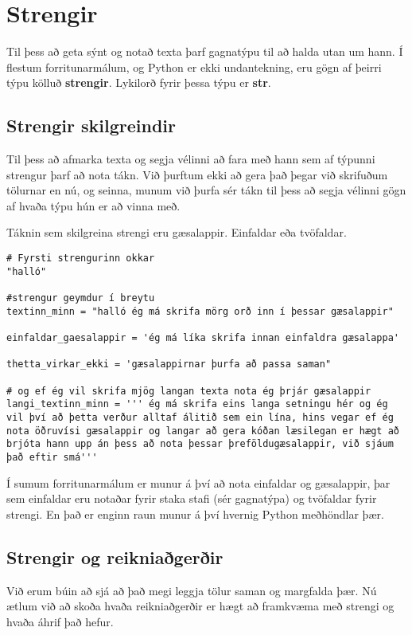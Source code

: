\chapter{Strengir}\label{k:strengir}
Til þess að geta sýnt og notað texta þarf gagnatýpu til að halda utan um hann. Í flestum forritunarmálum, og Python er ekki undantekning, eru gögn af þeirri týpu kölluð \textbf{strengir}.
Lykilorð fyrir þessa týpu er \textbf{str}.

\section{Strengir skilgreindir}
Til þess að afmarka texta og segja vélinni að fara með hann sem af týpunni strengur þarf að nota tákn.
Við þurftum ekki að gera það þegar við skrifuðum tölurnar en nú, og seinna, munum við þurfa sér tákn til þess að segja vélinni gögn af hvaða týpu hún er að vinna með.

Táknin sem skilgreina strengi eru gæsalappir.
Einfaldar eða tvöfaldar.

\begin{lstlisting}[caption="Strengir skilgreindir]
# Fyrsti strengurinn okkar
"halló"

#strengur geymdur í breytu
textinn_minn = "halló ég má skrifa mörg orð inn í þessar gæsalappir"

einfaldar_gaesalappir = 'ég má líka skrifa innan einfaldra gæsalappa'

thetta_virkar_ekki = 'gæsalappirnar þurfa að passa saman" 

# og ef ég vil skrifa mjög langan texta nota ég þrjár gæsalappir
langi_textinn_minn = ''' ég má skrifa eins langa setningu hér og ég vil því að þetta verður alltaf álitið sem ein lína, hins vegar ef ég nota öðruvísi gæsalappir og langar að gera kóðan læsilegan er hægt að brjóta hann upp án þess að nota þessar þreföldugæsalappir, við sjáum það eftir smá'''
\end{lstlisting}

Í sumum forritunarmálum er munur á því að nota einfaldar og gæsalappir, þar sem einfaldar eru notaðar fyrir staka stafi (sér gagnatýpa) og tvöfaldar fyrir strengi.
En það er enginn raun munur á því hvernig Python meðhöndlar þær.

\section{Strengir og reikniaðgerðir}
Við erum búin að sjá að það megi leggja tölur saman og margfalda þær.
Nú ætlum við að skoða hvaða reikniaðgerðir er hægt að framkvæma með strengi og hvaða áhrif það hefur.

